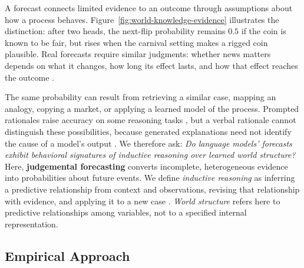 A forecast connects limited evidence to an outcome through assumptions about how a
process behaves. Figure~\ref{fig:world-knowledge-evidence} illustrates the
distinction: after two heads, the next-flip probability remains $0.5$ if the coin is
known to be fair, but rises when the carnival setting makes a rigged coin plausible.
Real forecasts require similar judgments: whether news matters depends on what it
changes, how long its effect lasts, and how that effect reaches the outcome
\citep{mellers2014psychological,tetlock2016superforecasting}.

The same probability can result from retrieving a similar case, mapping an analogy,
copying a market, or applying a learned model of the process. Prompted rationales
raise accuracy on some reasoning tasks \citep{kojima2022large}, but a verbal
rationale cannot distinguish these possibilities, because generated explanations
need not identify the cause of a model's output
\citep{jacovi2020towards,turpin2023language}.
We therefore ask: \emph{Do language models' forecasts exhibit behavioral signatures
of inductive reasoning over learned world structure?} Here, \textbf{judgemental
forecasting} converts incomplete, heterogeneous evidence into probabilities about
future events. We define \emph{inductive reasoning} as inferring a predictive
relationship from context and observations,
revising that relationship with evidence, and applying it to a new case
\citep{tenenbaum2006theory,tenenbaum2011mind,griffiths2010probabilistic,lake2015human,lake2017building}. \emph{World structure} refers here
to predictive relationships among variables, not to a specified internal
representation.

\subsection{Empirical Approach}
\label{sec:forecasting-as-inductive}

